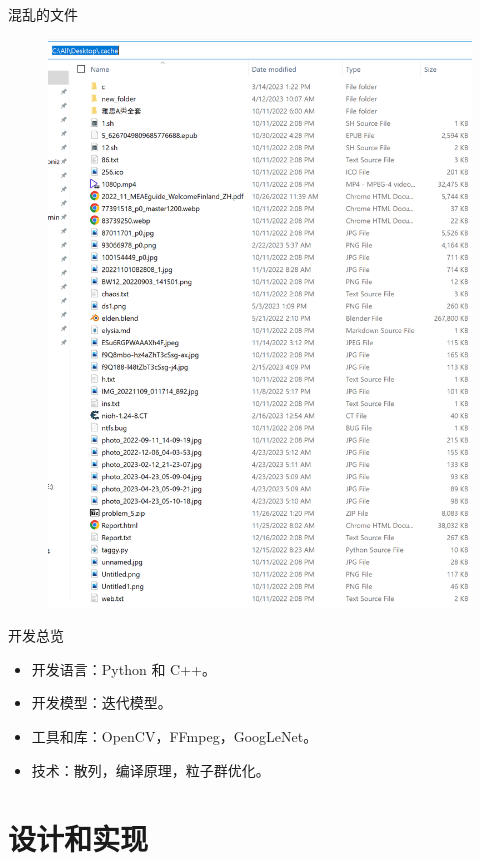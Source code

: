 \documentclass{beamer}
\begin{document}
\begin{frame}{混乱的文件}
\begin{minipage}[c]{0.5\linewidth}
\begin{figure}[h]
            \includegraphics[height=.6\textheight]{pic/cache.png}
        \end{figure}
    \end{minipage}
\end{frame}

\begin{frame}{开发总览}
    \begin{itemize}[<+-| alert@+>] %
        \item 开发语言：Python 和 C++。
        \item 开发模型：迭代模型。
        \item 工具和库：OpenCV，FFmpeg，GoogLeNet。
        \item 技术：散列，编译原理，粒子群优化。
    \end{itemize}
\end{frame}

\section{设计和实现}
\end{document}
